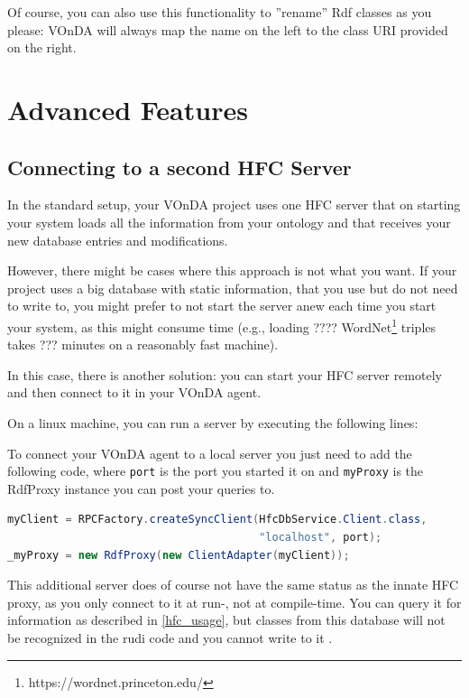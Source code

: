 \documentclass[a4paper]{report}
\newcommand{\vonda}{VOnDA\xspace}
\begin{document}
Of course, you can also use this functionality to ''rename'' Rdf classes as you
please: \vonda will always map the name on the left to the class URI provided
on the right.

\section{Advanced Features}

\subsection{Connecting to a second HFC Server}
In the standard setup, your \vonda project uses one HFC server that on starting your system loads all the information from your ontology and that receives your new database entries and modifications.

However, there might be cases where this approach is not what you want. If your project uses a big database with static information, that you use but do not need to write to, you might prefer to not start the server anew each time you start your system, as this might consume time (e.g., loading ???? WordNet\footnote{https://wordnet.princeton.edu/} triples takes ??? minutes on a reasonably fast machine).


In this case, there is another solution: you can start your HFC server remotely and then connect to it in your \vonda agent.

On a linux machine, you can run a server by executing the following lines:

To connect your \vonda agent to a local server you just need to add the following code, where \texttt{port} is the port you started it on and \texttt{myProxy} is the RdfProxy instance you can post your queries to.

\begin{center}
\begin{lstlisting}[language=Java]
myClient = RPCFactory.createSyncClient(HfcDbService.Client.class,
                                       "localhost", port);
_myProxy = new RdfProxy(new ClientAdapter(myClient));
\end{lstlisting}
\end{center}

This additional server does of course not have the same status as the innate HFC proxy, as you only connect to it at run-, not at compile-time. You can query it for information as described in \ref{hfc_usage}, but classes from this database will not be recognized in the rudi code and you cannot write to it . 
\end{document}
